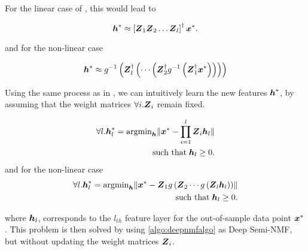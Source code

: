 \documentclass[10pt,journal,compsoc]{IEEEtran}
\providecommand{\norm}[1]{\lVert#1\rVert}
\begin{document}
For the linear case of \dwsf, this would lead to

\begin{equation}
  \boldsymbol{h}^{\ast} \approx \left[\boldsymbol{Z}_1 \boldsymbol{Z}_2 \ldots \boldsymbol{Z}_l\right]^{\dagger} \boldsymbol{x}^{\ast}.
\end{equation}

and for the non-linear case

\begin{equation}
  \boldsymbol{h}^{\ast} \approx g^{-1} \left(\boldsymbol{Z}_l^{\dagger} \left( \cdots \left(\boldsymbol{Z}_2^\dagger g^{-1}\left(\boldsymbol{Z}_1^\dagger \boldsymbol{x}^{\ast}\right)\right)\right)\right)
\end{equation}


\def\hnew{\bs h^{\ast}}


Using the same process as in \deepseminmf, we can intuitively learn the new features $\hnew$, by assuming that the weight matrices $\forall i. \boldsymbol{Z}_i$ remain fixed.

\begin{align}\label{eq:project_deep}
 \forall l. \bs h_l^{\ast} = \argmin_{\bs h} \norm{\bs x^{\ast} - \prod_{i=1}^l \bs Z_i \bs h_l} \\\notag \text{such that} \; \bs h_l \geq 0.
\end{align}
and for the non-linear case
\begin{align}\label{eq:project_deep_nonlinear}
 \forall l. \bs h_l^{\ast} = \argmin_{\bs h} \norm{\bs x^{\ast} - \bs Z_1 g\left(\bs Z_2 \cdots g\left(\bs Z_l \bs h_l\right)\right)} \\\notag \text{such that} \; \bs h_l \geq 0.
\end{align}


where $\boldsymbol{h}_l$, corresponds to the $l_{th}$ feature layer for the out-of-sample data point $\boldsymbol{x}^\ast$.  This problem is then solved by using \autoref{algo:deepnmfalgo} as Deep Semi-NMF, but without updating the weight matrices $\boldsymbol{Z}_i$.
\end{document}
